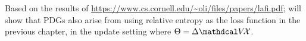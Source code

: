     \label{chap:relent-soup}

    \TODO

Based on the results of \url{https://www.cs.cornell.edu/~oli/files/papers/lafi.pdf};
will show that PDGs also arise from using relative entropy as the loss function in the previous chapter, in the update setting where $\Theta = \Delta \V\!\X$. 




